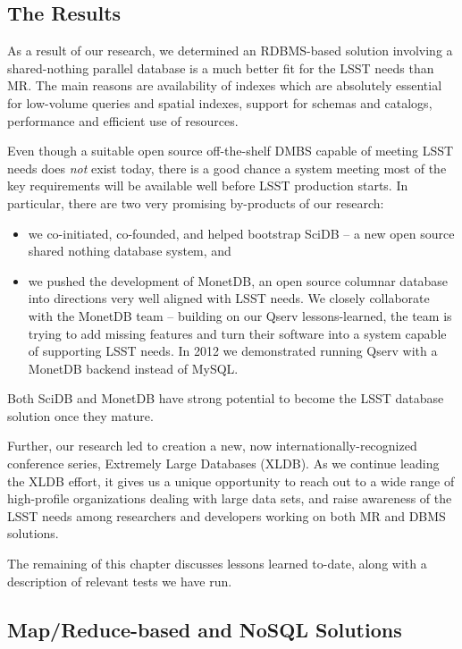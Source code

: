 \documentclass[DM,lsstdraft,toc]{lsstdoc}
\begin{document}
\subsection{The Results}\label{the-results}

As a result of our research, we determined an RDBMS-based solution
involving a shared-nothing parallel database is a much better fit for
the LSST needs than MR. The main reasons are availability of indexes
which are absolutely essential for low-volume queries and spatial
indexes, support for schemas and catalogs, performance and efficient use
of resources.

Even though a suitable open source off-the-shelf DMBS capable of meeting
LSST needs does \emph{not} exist today, there is a good chance a system
meeting most of the key requirements will be available well before LSST
production starts. In particular, there are two very promising
by-products of our research:

\begin{itemize}
\item
  we co-initiated, co-founded, and helped bootstrap SciDB -- a new open
  source shared nothing database system, and
\item
  we pushed the development of MonetDB, an open source columnar database
  into directions very well aligned with LSST needs. We closely
  collaborate with the MonetDB team -- building on our Qserv
  lessons-learned, the team is trying to add missing features and turn
  their software into a system capable of supporting LSST needs. In 2012
  we demonstrated running Qserv with a MonetDB backend instead of MySQL.
\end{itemize}

Both SciDB and MonetDB have strong potential to become the LSST database
solution once they mature.

Further, our research led to creation a new, now
internationally-recognized conference series,
Extremely Large Databases (XLDB). As we continue
leading the XLDB effort, it gives us a unique
opportunity to reach out to a wide range of high-profile organizations
dealing with large data sets, and raise awareness of the LSST needs
among researchers and developers working on both MR and DBMS solutions.

The remaining of this chapter discusses lessons learned to-date, along
with a description of relevant tests we have run.

\subsection{Map/Reduce-based and NoSQL
Solutions}\label{mapreduce-based-and-nosql-solutions}
\end{document}
